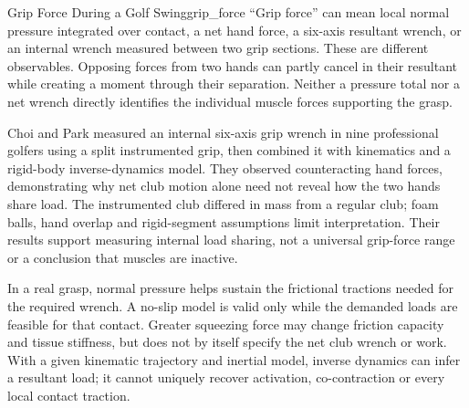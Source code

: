 \begin{example}{Grip Force During a Golf Swing}{grip_force}
``Grip force'' can mean local normal pressure integrated over contact, a net hand force, a six-axis resultant wrench, or an internal wrench measured between two grip sections. These are different observables. Opposing forces from two hands can partly cancel in their resultant while creating a moment through their separation. Neither a pressure total nor a net wrench directly identifies the individual muscle forces supporting the grasp.

Choi and Park measured an internal six-axis grip wrench in nine professional golfers using a split instrumented grip, then combined it with kinematics and a rigid-body inverse-dynamics model. They observed counteracting hand forces, demonstrating why net club motion alone need not reveal how the two hands share load. The instrumented club differed in mass from a regular club; foam balls, hand overlap and rigid-segment assumptions limit interpretation. Their results support measuring internal load sharing, not a universal grip-force range or a conclusion that muscles are inactive. \citep{Choi2020GripKinetics}

In a real grasp, normal pressure helps sustain the frictional tractions needed for the required wrench. A no-slip model is valid only while the demanded loads are feasible for that contact. Greater squeezing force may change friction capacity and tissue stiffness, but does not by itself specify the net club wrench or work. With a given kinematic trajectory and inertial model, inverse dynamics can infer a resultant load; it cannot uniquely recover activation, co-contraction or every local contact traction.
\end{example}


